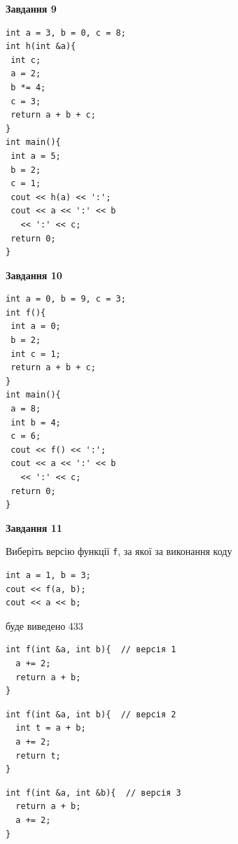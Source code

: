 \documentclass[12pt, ukrainian]{article}
\def\code#1{\Verb!#1!}
\begin{document}
{\begin {large}
\begin{minipage}[t]{11.0cm}
\end{minipage}


\begin{minipage}[t]{7.0cm}

\begin{center}
\textbf{Завдання 9}
\end{center}
\vspace{-8mm}

\begin{verbatim}
int a = 3, b = 0, c = 8;
int h(int &a){
 int c;
 a = 2;
 b *= 4;
 c = 3;
 return a + b + c;
}
int main(){
 int a = 5;
 b = 2;
 c = 1;
 cout << h(a) << ':';
 cout << a << ':' << b 
   << ':' << c;
 return 0;
}
\end{verbatim}



\begin{center}
\textbf{Завдання 10}
\end{center}
\vspace{-8mm}

\begin{verbatim}
int a = 0, b = 9, c = 3;
int f(){
 int a = 0;
 b = 2;
 int c = 1;
 return a + b + c;
}
int main(){
 a = 8;
 int b = 4;
 c = 6;
 cout << f() << ':';
 cout << a << ':' << b 
   << ':' << c;
 return 0;
}
\end{verbatim}

\end{minipage}
\vline \hspace{1mm}
\begin{minipage}[t]{11.0cm}

\begin{center}
\textbf{Завдання 11}
\end{center}
Виберіть версію функції \code{f}, за якої за виконання коду
\begin{verbatim}
int a = 1, b = 3;
cout << f(a, b);
cout << a << b;
\end{verbatim}

буде виведено 433

\begin{verbatim}
int f(int &a, int b){  // версія 1
  a += 2;
  return a + b;
}
\end{verbatim}

\vspace{-8mm}\begin{verbatim}
int f(int &a, int b){  // версія 2
  int t = a + b;
  a += 2;
  return t;
}
\end{verbatim}

\vspace{-8mm}\begin{verbatim}
int f(int &a, int &b){  // версія 3
  return a + b;
  a += 2;
}
\end{verbatim}


\end{minipage}
\end{large}}
\end{document}
